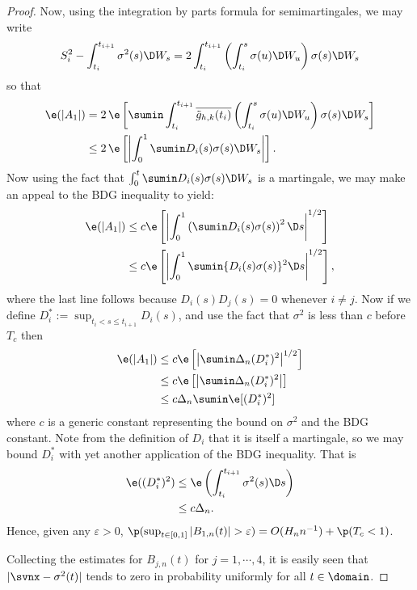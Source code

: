 \begin{proof}
Now, using the integration by parts formula for semimartingales, we may write
\begin{align}
  S^2_i - \int^{t_{i+ 1}}_{t_i} \sigma^2(s) \D W_s = 2\int_{t_i}^{t_{i+1}}\left(\int_{t_i}^{s} \sigma(u)\D W_u\right)\sigma(s) \D W_s\notag
  \label{}
\end{align}
so that 
\begin{align}
  \e(\vert A_1 \vert )  &= 2\,\e\left[\sumin\int_{t_i}^{t_{i+1}}\btghki\left(\int_{t_i}^{s} \sigma(u)\D W_u\right)\sigma(s) \D W_s\right ]\notag \\
  & \le 2\,\e\left[\left\vert\int_0^{1}\sumin D_i(s) \sigma(s) \D W_s\right\vert \right].\notag 
  \label{}
\end{align}
Now using the fact that $\int_0^{t}\sumin D_i(s) \sigma(s) \D W_s$ is a  martingale, we may make an appeal to the BDG inequality to yield:
\begin{align}
  \e(\vert A_1 \vert) & \le c\e\left[\left\vert\int_0^{1}\left(\sumin D_i(s) \sigma(s)\right)^2 \D s\right\vert^{1/2} \right]\notag \\
  & \le c\e\left[\left\vert\int_0^{1}\sumin \{D_i(s) \sigma(s)\}^2 \D s\right\vert^{1/2} \right]\notag,
  \notag
  \label{}
\end{align}
where the last line follows because $D_i (s) D_j(s) = 0$ whenever $i \not= j$. Now if  we define $D^*_i := \sup_{t_i <s \le t_{i+1}} D_i(s)$, and use the fact that $\sigma^2$ is less than  $c$ before $T_c$ then
\begin{align}
  \e(\vert A_1\vert ) & \le c\e\left[\left\vert\sumin \Delta_n(D_i^*)^2 \right\vert^{1/2} \right] \notag\\
  & \le c\e\left[\left\vert\sumin \Delta_n(D_i^*)^2 \right\vert \right] \notag\\
  & \le c\Delta_n\sumin\e[(D_i^*)^2]   
  \label{eq:ra1}
\end{align}
where $c$ is a generic constant representing the bound on $\sigma^2$ and the BDG constant.  Note  from the definition of  $D_i$  that it  is itself a martingale, so we may bound  $D^*_i$  with yet another application of the BDG inequality. That is
\begin{align}
  \e((D^*_i)^2) &\le \e\left(\int^{t_{i+1}}_{t_i} \sigma^2(s) \D s\right) \notag\\
  &\le c \Delta_n. 
  \label{}
\end{align}
Hence, given any $\varepsilon > 0$,  $\p( \sup_{t \in [0,1]} \vert B_{1,n}(t) \vert > \varepsilon)  = O(H_n n^{-1}) + \p(T_c < 1)$.

Collecting the estimates for $B_{j,n}(t)$ for $j =1,\cdots,4$, it is easily seen that $\vert \svnx - \sigma^2(t) \vert$ tends to zero in probability uniformly  for all $t \in \domain$. 
\end{proof}
